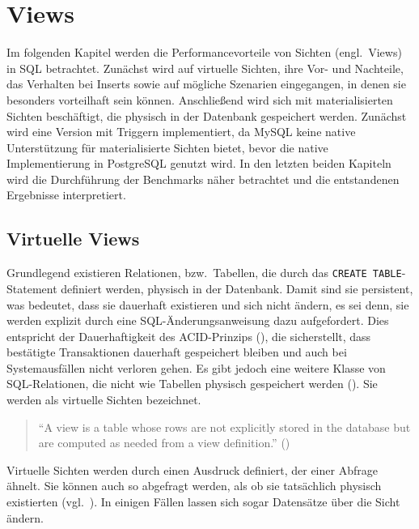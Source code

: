 
\chapter{Views}\label{ch:views}
Im folgenden Kapitel werden die Performancevorteile von Sichten (engl.\ Views) in SQL betrachtet.
Zunächst wird auf virtuelle Sichten, ihre Vor- und Nachteile, das Verhalten bei Inserts sowie auf mögliche Szenarien eingegangen, in denen sie besonders vorteilhaft sein können.
Anschließend wird sich mit materialisierten Sichten beschäftigt, die physisch in der Datenbank gespeichert werden.
Zunächst wird eine Version mit Triggern implementiert, da MySQL keine native Unterstützung für materialisierte Sichten bietet, bevor die native Implementierung in PostgreSQL genutzt wird.
In den letzten beiden Kapiteln wird die Durchführung der Benchmarks näher betrachtet und die entstandenen Ergebnisse interpretiert.

\section{Virtuelle Views}\label{sec:virtuelle-views}

Grundlegend existieren Relationen, bzw.\ Tabellen, die durch das \texttt{CREATE TABLE}-Statement definiert werden, physisch in der Datenbank.
Damit sind sie persistent, was bedeutet, dass sie dauerhaft existieren und sich nicht ändern, es sei denn, sie werden explizit durch eine SQL-Änderungsanweisung dazu aufgefordert.
Dies entspricht der Dauerhaftigkeit des ACID-Prinzips (\cite[S. 630--631]{silberschatz2011database}), die sicherstellt, dass bestätigte Transaktionen dauerhaft gespeichert bleiben und auch bei Systemausfällen nicht verloren gehen.
Es gibt jedoch eine weitere Klasse von SQL-Relationen, die nicht wie Tabellen physisch gespeichert werden (\cite[341--349, 353--366]{garcia2008database}).
Sie werden als virtuelle Sichten bezeichnet.

\begin{quote}
    \enquote{A view is a table whose rows are not explicitly stored in the database but are computed as needed from a view definition.} (\cite[S. 86]{ramakrishnan2002database})
\end{quote}

Virtuelle Sichten werden durch einen Ausdruck definiert, der einer Abfrage ähnelt.
Sie können auch so abgefragt werden, als ob sie tatsächlich physisch existierten (vgl.\ \cite[S. 87]{ramakrishnan2002database}).
In einigen Fällen lassen sich sogar Datensätze über die Sicht ändern.

